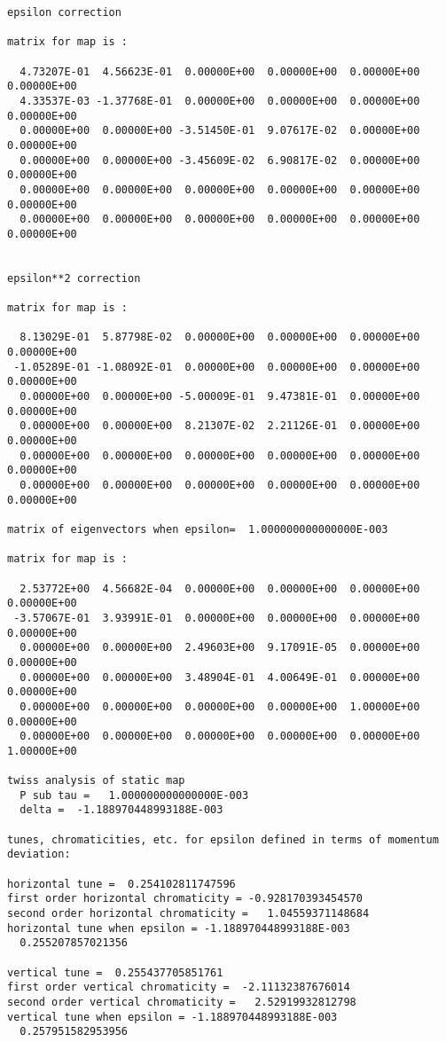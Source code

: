\begin{footnotesize}
\begin{verbatim}
epsilon correction

matrix for map is :

  4.73207E-01  4.56623E-01  0.00000E+00  0.00000E+00  0.00000E+00  0.00000E+00
  4.33537E-03 -1.37768E-01  0.00000E+00  0.00000E+00  0.00000E+00  0.00000E+00
  0.00000E+00  0.00000E+00 -3.51450E-01  9.07617E-02  0.00000E+00  0.00000E+00
  0.00000E+00  0.00000E+00 -3.45609E-02  6.90817E-02  0.00000E+00  0.00000E+00
  0.00000E+00  0.00000E+00  0.00000E+00  0.00000E+00  0.00000E+00  0.00000E+00
  0.00000E+00  0.00000E+00  0.00000E+00  0.00000E+00  0.00000E+00  0.00000E+00


epsilon**2 correction

matrix for map is :

  8.13029E-01  5.87798E-02  0.00000E+00  0.00000E+00  0.00000E+00  0.00000E+00
 -1.05289E-01 -1.08092E-01  0.00000E+00  0.00000E+00  0.00000E+00  0.00000E+00
  0.00000E+00  0.00000E+00 -5.00009E-01  9.47381E-01  0.00000E+00  0.00000E+00
  0.00000E+00  0.00000E+00  8.21307E-02  2.21126E-01  0.00000E+00  0.00000E+00
  0.00000E+00  0.00000E+00  0.00000E+00  0.00000E+00  0.00000E+00  0.00000E+00
  0.00000E+00  0.00000E+00  0.00000E+00  0.00000E+00  0.00000E+00  0.00000E+00

matrix of eigenvectors when epsilon=  1.000000000000000E-003

matrix for map is :

  2.53772E+00  4.56682E-04  0.00000E+00  0.00000E+00  0.00000E+00  0.00000E+00
 -3.57067E-01  3.93991E-01  0.00000E+00  0.00000E+00  0.00000E+00  0.00000E+00
  0.00000E+00  0.00000E+00  2.49603E+00  9.17091E-05  0.00000E+00  0.00000E+00
  0.00000E+00  0.00000E+00  3.48904E-01  4.00649E-01  0.00000E+00  0.00000E+00
  0.00000E+00  0.00000E+00  0.00000E+00  0.00000E+00  1.00000E+00  0.00000E+00
  0.00000E+00  0.00000E+00  0.00000E+00  0.00000E+00  0.00000E+00  1.00000E+00

twiss analysis of static map
  P sub tau =   1.000000000000000E-003
  delta =  -1.188970448993188E-003

tunes, chromaticities, etc. for epsilon defined in terms of momentum
deviation:

horizontal tune =  0.254102811747596
first order horizontal chromaticity = -0.928170393454570
second order horizontal chromaticity =   1.04559371148684
horizontal tune when epsilon = -1.188970448993188E-003
  0.255207857021356

vertical tune =  0.255437705851761
first order vertical chromaticity =  -2.11132387676014
second order vertical chromaticity =   2.52919932812798
vertical tune when epsilon = -1.188970448993188E-003
  0.257951582953956


\end{verbatim}
\end{footnotesize}
